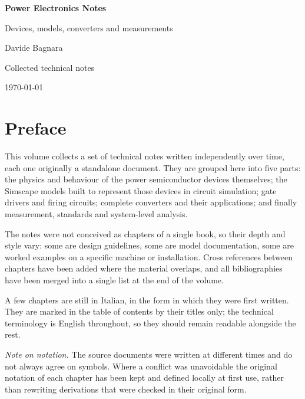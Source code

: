 
\begin{titlepage}
\centering
\vspace*{4cm}

{\Huge\bfseries Power Electronics Notes\par}
\vspace{6mm}
{\Large Devices, models, converters and measurements\par}

\vspace{3cm}
{\large Davide Bagnara\par}

\vfill
{\small Collected technical notes\par}
{\small \today\par}
\end{titlepage}

\chapter*{Preface}

This volume collects a set of technical notes written independently over
time, each one originally a standalone document. They are grouped here into
five parts: the physics and behaviour of the power semiconductor devices
themselves; the Simscape models built to represent those devices in circuit
simulation; gate drivers and firing circuits; complete converters and their
applications; and finally measurement, standards and system-level analysis.

The notes were not conceived as chapters of a single book, so their depth and
style vary: some are design guidelines, some are model documentation, some are
worked examples on a specific machine or installation. Cross references between
chapters have been added where the material overlaps, and all bibliographies
have been merged into a single list at the end of the volume.

A few chapters are still in Italian, in the form in which they were first
written. They are marked in the table of contents by their titles only; the
technical terminology is English throughout, so they should remain readable
alongside the rest.

\vspace{5mm}
\noindent\emph{Note on notation.} The source documents were written at different
times and do not always agree on symbols. Where a conflict was unavoidable the
original notation of each chapter has been kept and defined locally at first
use, rather than rewriting derivations that were checked in their original form.
